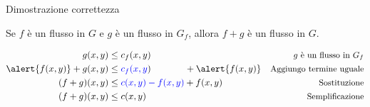 \begin{frame}{Dimostrazione correttezza}

\vspace{-9pt}
\begin{myboxtitle}[Lemma]
Se $f$ è un flusso in $G$ e $g$ è un flusso in $G_f$, allora
$f+g$ è un flusso in $G$.
\end{myboxtitle}

\begin{overprint}
\begin{myboxtitle}
\small
\begin{align*}
g(x,y) &\leq c_f(x,y) & \textrm{\small $g$ è un flusso in $G_f$} \\
\alert{f(x,y)} + g(x,y) &\leq  \textcolor{blue}{c_f(x,y}) \qquad\quad~~ + \alert{f(x,y)} & \textrm{\small Aggiungo termine uguale}\\
(f+g)(x,y) &\leq \textcolor{blue}{c(x,y)-f(x,y)} + f(x,y) & \textrm{\small Sostituzione}\\
(f+g)(x,y) &\leq c(x,y) & \textrm{\small Semplificazione}
\end{align*}
\end{myboxtitle}
\end{overprint}

\end{frame}

